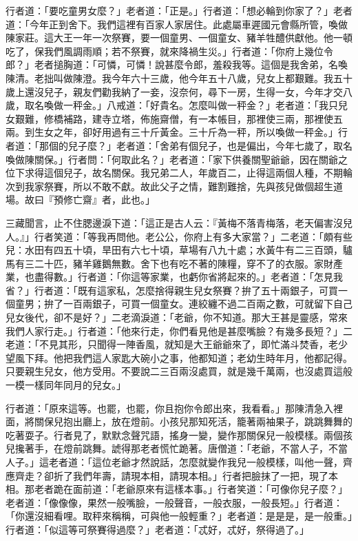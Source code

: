 行者道：「要吃童男女麼？」老者道：「正是。」行者道：「想必輪到你家了？」老者道：「今年正到舍下。我們這裡有百家人家居住。此處屬車遲國元會縣所管，喚做陳家莊。這大王一年一次祭賽，要一個童男、一個童女、豬羊牲醴供獻他。他一頓吃了，保我們風調雨順；若不祭賽，就來降禍生災。」行者道：「你府上幾位令郎？」老者搥胸道：「可憐，可憐！說甚麼令郎，羞殺我等。這個是我舍弟，名喚陳清。老拙叫做陳澄。我今年六十三歲，他今年五十八歲，兒女上都艱難。我五十歲上還沒兒子，親友們勸我納了一妾，沒奈何，尋下一房，生得一女，今年才交八歲，取名喚做一秤金。」八戒道：「好貴名。怎麼叫做一秤金？」老者道：「我只兒女艱難，修橋補路，建寺立塔，佈施齋僧，有一本帳目，那裡使三兩，那裡使五兩。到生女之年，卻好用過有三十斤黃金。三十斤為一秤，所以喚做一秤金。」行者道：「那個的兒子麼？」老者道：「舍弟有個兒子，也是偏出，今年七歲了，取名喚做陳關保。」行者問：「何取此名？」老者道：「家下供養關聖爺爺，因在關爺之位下求得這個兒子，故名關保。我兄弟二人，年歲百二，止得這兩個人種，不期輪次到我家祭賽，所以不敢不獻。故此父子之情，難割難捨，先與孩兒做個超生道場。故曰『預修亡齋』者，此也。」

三藏聞言，止不住腮邊淚下道：「這正是古人云：『黃梅不落青梅落，老天偏害沒兒人。』」行者笑道：「等我再問他。老公公，你府上有多大家當？」二老道：「頗有些兒：水田有四五十頃，旱田有六七十頃，草場有八九十處；水黃牛有二三百頭，驢馬有三二十匹，豬羊雞鵝無數。舍下也有吃不著的陳糧，穿不了的衣服。家財產業，也盡得數。」行者道：「你這等家業，也虧你省將起來的。」老者道：「怎見我省？」行者道：「既有這家私，怎麼捨得親生兒女祭賽？拚了五十兩銀子，可買一個童男；拚了一百兩銀子，可買一個童女。連絞纏不過二百兩之數，可就留下自己兒女後代，卻不是好？」二老滴淚道：「老爺，你不知道。那大王甚是靈感，常來我們人家行走。」行者道：「他來行走，你們看見他是甚麼嘴臉？有幾多長短？」二老道：「不見其形，只聞得一陣香風，就知是大王爺爺來了，即忙滿斗焚香，老少望風下拜。他把我們這人家匙大碗小之事，他都知道；老幼生時年月，他都記得。只要親生兒女，他方受用。不要說二三百兩沒處買，就是幾千萬兩，也沒處買這般一模一樣同年同月的兒女。」

行者道：「原來這等。也罷，也罷，你且抱你令郎出來，我看看。」那陳清急入裡面，將關保兒抱出廳上，放在燈前。小孩兒那知死活，籠著兩袖果子，跳跳舞舞的吃著耍子。行者見了，默默念聲咒語，搖身一變，變作那關保兒一般模樣。兩個孩兒攙著手，在燈前跳舞。諕得那老者慌忙跪著。唐僧道：「老爺，不當人子，不當人子。」這老者道：「這位老爺才然說話，怎麼就變作我兒一般模樣，叫他一聲，齊應齊走？卻折了我們年壽，請現本相，請現本相。」行者把臉抹了一把，現了本相。那老者跪在面前道：「老爺原來有這樣本事。」行者笑道：「可像你兒子麼？」老者道：「像像像，果然一般嘴臉，一般聲音，一般衣服，一般長短。」行者道：「你還沒細看哩。取秤來稱稱，可與他一般輕重？」老者道：是是是，是一般重。」行者道：「似這等可祭賽得過麼？」老者道：「忒好，忒好，祭得過了。」

